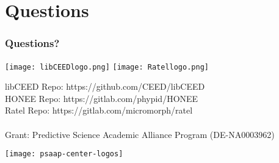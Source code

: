 \documentclass{beamer}
\begin{document}
\section{Questions}

\begin{frame}
\frametitle{Questions?}

\begin{center}
\texttt{[image: libCEEDlogo.png]}
\texttt{[image: Ratellogo.png]}
\end{center}

{\flushleft

libCEED Repo: https://github.com/CEED/libCEED\\
HONEE Repo: https://gitlab.com/phypid/HONEE\\
Ratel Repo: https://gitlab.com/micromorph/ratel\\

~\\

Grant: Predictive Science Academic Alliance Program (DE-NA0003962)\\

}

\begin{center}
\texttt{[image: psaap-center-logos]}
\end{center}

\end{frame}

\end{document}
